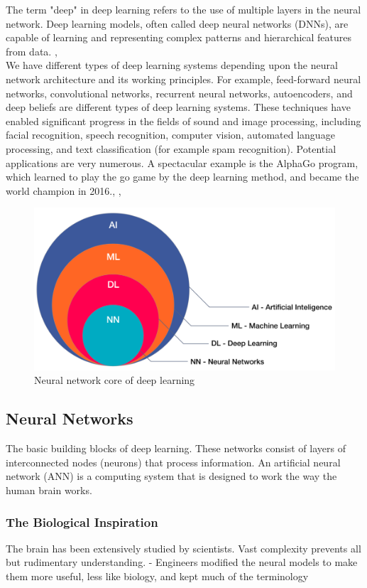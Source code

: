 The term "deep" in deep learning refers to the use of multiple layers in the neural network. Deep learning models, often called deep neural networks (DNNs), are capable of learning and representing complex patterns and hierarchical features from data. \cite{nielsen2015neural} \cite{Arnold2011AnIT}, \cite{2015Natur.521..436L} \\

We have different types of deep learning systems depending upon the neural network architecture and its working principles. For example, feed-forward neural networks, convolutional networks, recurrent neural networks, autoencoders, and deep beliefs are different types of deep learning systems.
These techniques have enabled significant progress in the fields of sound and image processing, including facial recognition, speech recognition, computer
vision, automated language processing, and text classification (for example spam recognition). Potential applications are very numerous. A spectacular example is the AlphaGo program, which learned to play the go game by the deep learning method, and became the world champion in 2016.\cite{koons2005}, \cite{shinde2018review}, \cite{choi2020introduction}
\begin{figure}[H]
    \centering
    \includegraphics[width=0.8\linewidth]{tex/img/NN_DL_ML.png}
    \caption{Neural network core of deep learning}
    \label{fig:NN_DL}
\end{figure}

\subsection{Neural Networks}
The basic building blocks of deep learning. These networks consist of layers of interconnected nodes (neurons) that process information.
An artificial neural network (ANN) is a computing system that is designed to work the way the human brain works.

\subsubsection{The Biological Inspiration}
The brain has been extensively studied by scientists. Vast complexity prevents all but rudimentary understanding. 
- Engineers modified the neural models to make them more useful, less like biology, and kept much of the terminology

